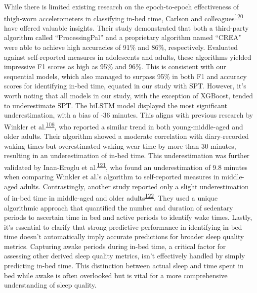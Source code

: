\documentclass[
  10pt,
]{scrbook}
\begin{document}
While there is limited existing research on the epoch-to-epoch
effectiveness of thigh-worn accelerometers in classifying in-bed time,
Carlson and
colleagues\textsuperscript{\protect\hyperlink{ref-carlson_validity_2021}{120}}
have offered valuable insights. Their study demonstrated that both a
third-party algorithm called ``ProcessingPal'' and a proprietary
algorithm named ``CREA'' were able to achieve high accuracies of 91\%
and 86\%, respectively. Evaluated against self-reported measures in
adolescents and adults, these algorithms yielded impressive F1 scores as
high as 95\% and 96\%. This is consistent with our sequential models,
which also managed to surpass 95\% in both F1 and accuracy scores for
identifying in-bed time, equated in our study with SPT. However, it's
worth noting that all models in our study, with the exception of
XGBoost, tended to underestimate SPT. The biLSTM model displayed the
most significant underestimation, with a bias of -36 minutes. This
aligns with previous research by Winkler et
al.\textsuperscript{\protect\hyperlink{ref-winkler_identifying_2016}{106}},
who reported a similar trend in both young-middle-aged and older adults.
Their algorithm showed a moderate correlation with diary-recorded waking
times but overestimated waking wear time by more than 30 minutes,
resulting in an underestimation of in-bed time. This underestimation was
further validated by Inan-Eroglu et
al.\textsuperscript{\protect\hyperlink{ref-inan-eroglu_comparison_2021}{121}},
who found an underestimation of 9.8 minutes when comparing Winkler et
al.'s algorithm to self-reported measures in middle-aged adults.
Contrastingly, another study reported only a slight underestimation of
in-bed time in middle-aged and older
adults\textsuperscript{\protect\hyperlink{ref-van_der_berg_identifying_2016}{122}}.
They used a unique algorithmic approach that quantified the number and
duration of sedentary periods to ascertain time in bed and active
periods to identify wake times. Lastly, it's essential to clarify that
strong predictive performance in identifying in-bed time doesn't
automatically imply accurate predictions for broader sleep quality
metrics. Capturing awake periods during in-bed time, a critical factor
for assessing other derived sleep quality metrics, isn't effectively
handled by simply predicting in-bed time. This distinction between
actual sleep and time spent in bed while awake is often overlooked but
is vital for a more comprehensive understanding of sleep quality.
\end{document}
